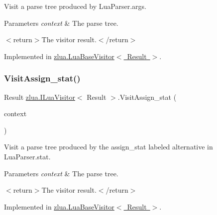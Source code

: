 Visit a parse tree produced by Lua\+Parser.\+args. 


\begin{DoxyParams}{Parameters}
{\em context} & The parse tree.\\
\hline
\end{DoxyParams}
$<$return$>$The visitor result.$<$/return$>$ 

Implemented in \mbox{\hyperlink{classzlua_1_1_lua_base_visitor_a63b313917c68dfb908b9e8217a2ed5c8}{zlua.\+Lua\+Base\+Visitor$<$ Result $>$}}.

\mbox{\label{interfacezlua_1_1_i_lua_visitor_a079bc4442510a3a834234725ef2b9673}} 
\subsubsection{\texorpdfstring{Visit\+Assign\+\_\+stat()}{VisitAssign\_stat()}}
{\footnotesize\ttfamily Result \mbox{\hyperlink{interfacezlua_1_1_i_lua_visitor}{zlua.\+I\+Lua\+Visitor}}$<$ Result $>$.Visit\+Assign\+\_\+stat (\begin{DoxyParamCaption}\item[{\mbox{[}\+Not\+Null\mbox{]} \mbox{\hyperlink{classzlua_1_1_lua_parser_1_1_assign__stat_context}{Lua\+Parser.\+Assign\+\_\+stat\+Context}}}]{context }\end{DoxyParamCaption})}



Visit a parse tree produced by the {\ttfamily assign\+\_\+stat} labeled alternative in Lua\+Parser.\+stat. 


\begin{DoxyParams}{Parameters}
{\em context} & The parse tree.\\
\hline
\end{DoxyParams}
$<$return$>$The visitor result.$<$/return$>$ 

Implemented in \mbox{\hyperlink{classzlua_1_1_lua_base_visitor_a803c8c7b10f83503634a866019163d28}{zlua.\+Lua\+Base\+Visitor$<$ Result $>$}}.

\mbox{\label{interfacezlua_1_1_i_lua_visitor_ac9b4c733334bfea82d43eb3b41009274}} 
